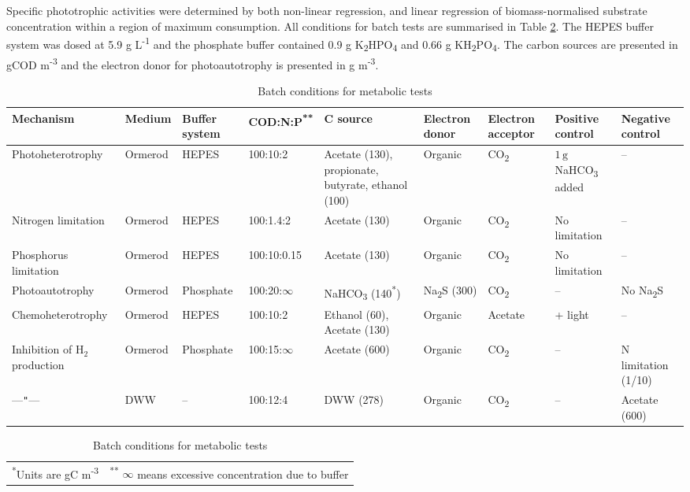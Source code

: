 Specific phototrophic activities were determined by both non-linear regression, and linear regression of biomass-normalised substrate concentration within a region of maximum consumption. All conditions for batch tests are summarised in Table \ref{tab:batch}. The HEPES buffer system was dosed at 5.9 g L\textsuperscript{-1} and the phosphate buffer contained 0.9 g K\textsubscript{2}HPO\textsubscript{4} and 0.66 g KH\textsubscript{2}PO\textsubscript{4}. The carbon sources are presented in gCOD m\textsuperscript{-3} and the electron donor for photoautotrophy is presented in g m\textsuperscript{-3}. 

\begin{table}[tp]
    \centering
    \small
    \renewcommand{\arraystretch}{1.4}
    \caption{Batch conditions for metabolic tests}
    \tabcolsep=0.11cm
    \begin{tabular}{@{}p{3cm} p{1.4cm} p{1.5cm} p{1.7cm} p{1.4cm} p{1.4cm} p{1.4cm} p{1.4cm} p{1.4cm}@{}} \toprule
        Mechanism & Medium & Buffer system & COD:N:P\textsuperscript{**} & C source & Electron donor & Electron acceptor & Positive control & Negative control\\
        \hline
        Photoheterotrophy & Ormerod& HEPES & 100:10:2 & Acetate (130), propionate, butyrate, ethanol (100) & Organic & CO\textsubscript{2}&  $\mathrm{1\, g}$ NaHCO\textsubscript{3} added&  -- \\
        
        Nitrogen limitation & Ormerod&  HEPES & 100:1.4:2& Acetate (130) & Organic & CO\textsubscript{2}& No limitation & -- \\
        
        Phosphorus limitation & Ormerod & HEPES & 100:10:0.15 & Acetate (130) & Organic & CO\textsubscript{2}& No limitation & -- \\
        
        Photoautotrophy & Ormerod & Phosphate & 100:20:$\infty$ & NaHCO\textsubscript{3} (140\textsuperscript{*}) & Na\textsubscript{2}S (300)& CO\textsubscript{2}& -- & No Na\textsubscript{2}S \\
        
        Chemoheterotrophy & Ormerod & HEPES &100:10:2 & Ethanol (60), Acetate (130) & Organic& Acetate& + light& -- \\
        
        Inhibition of $\mathrm{H_2}$ production & 
        Ormerod & Phosphate & 100:15:$\infty$&Acetate (600) & Organic & CO\textsubscript{2} & --  & N limitation (1/10) \\
        ---\texttt{"}---& DWW & -- & 100:12:4 &DWW (278) & Organic & CO\textsubscript{2}&-- &Acetate (600) \\
        \bottomrule
    \end{tabular}
    \footnotesize
    \begin{tabular}{@{}p{4cm} p{10cm}}
        \textsuperscript{*}Units are gC m\textsuperscript{-3} & \textsuperscript{**} $\infty$ means excessive concentration due to buffer \\
    \end{tabular}
    \label{tab:batch}
\end{table}

